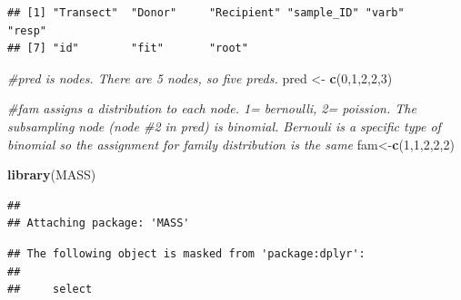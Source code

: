 \documentclass[
]{article}
\newenvironment{Shaded}{\begin{snugshade}}{\end{snugshade}}
\newcommand{\CommentTok}[1]{\textcolor[rgb]{0.56,0.35,0.01}{\textit{#1}}}
\newcommand{\DecValTok}[1]{\textcolor[rgb]{0.00,0.00,0.81}{#1}}
\newcommand{\FunctionTok}[1]{\textcolor[rgb]{0.13,0.29,0.53}{\textbf{#1}}}
\newcommand{\NormalTok}[1]{#1}
\newcommand{\OtherTok}[1]{\textcolor[rgb]{0.56,0.35,0.01}{#1}}
\newcommand{\SpecialCharTok}[1]{\textcolor[rgb]{0.81,0.36,0.00}{\textbf{#1}}}
\begin{document}
\begin{verbatim}
## [1] "Transect"  "Donor"     "Recipient" "sample_ID" "varb"      "resp"     
## [7] "id"        "fit"       "root"
\end{verbatim}

\begin{Shaded}
\begin{Highlighting}[]
\CommentTok{\#pred is nodes. There are 5 nodes, so five preds.}
\NormalTok{pred }\OtherTok{\textless{}{-}} \FunctionTok{c}\NormalTok{(}\DecValTok{0}\NormalTok{,}\DecValTok{1}\NormalTok{,}\DecValTok{2}\NormalTok{,}\DecValTok{2}\NormalTok{,}\DecValTok{3}\NormalTok{)}

\CommentTok{\#fam assigns a distribution to each node. 1= bernoulli, 2= poission. The subsampling node (node \#2 in pred) is binomial. Bernouli is a specific type of binomial so the assignment for family distribution is the same}
\NormalTok{fam}\OtherTok{\textless{}{-}}\FunctionTok{c}\NormalTok{(}\DecValTok{1}\NormalTok{,}\DecValTok{1}\NormalTok{,}\DecValTok{2}\NormalTok{,}\DecValTok{2}\NormalTok{,}\DecValTok{2}\NormalTok{)}
\end{Highlighting}
\end{Shaded}

\begin{Shaded}
\begin{Highlighting}[]
\FunctionTok{library}\NormalTok{(MASS)}
\end{Highlighting}
\end{Shaded}

\begin{verbatim}
## 
## Attaching package: 'MASS'
\end{verbatim}

\begin{verbatim}
## The following object is masked from 'package:dplyr':
## 
##     select
\end{verbatim}

\begin{Shaded}
\end{Shaded}
\end{document}
